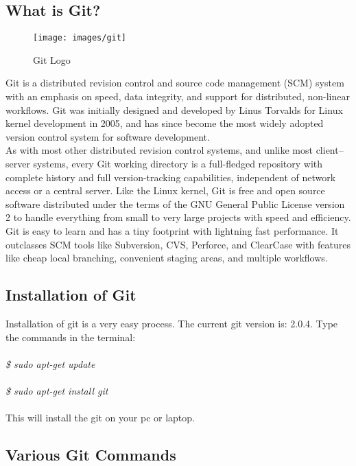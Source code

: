 \subsection{What is Git?}
\begin{figure}[!ht]
\centering
\texttt{[image: images/git]}                   
\caption{Git Logo}
\hspace{-1.5em}
\end{figure}
Git is a distributed revision control and source code management (SCM) system with an emphasis on speed, data integrity, and support for distributed, non-linear workflows. Git was initially designed and developed by Linus Torvalds for Linux kernel development in 2005, and has since become the most widely adopted version control system for software development.\\

As with most other distributed revision control systems, and unlike most client–server systems, every Git working directory is a full-fledged repository with complete history and full version-tracking capabilities, independent of network access or a central server. Like the Linux kernel, Git is free and open source software distributed under the terms of the GNU General Public License version 2 to handle everything from small to very large projects with speed and efficiency.\\

Git is easy to learn and has a tiny footprint with lightning fast performance. It outclasses SCM tools like Subversion, CVS, Perforce, and ClearCase with features like cheap local branching, convenient staging areas, and multiple workflows.\\

\subsection{Installation of Git}

Installation of git is a very easy process.
The current git version is: 2.0.4.
Type the commands in the terminal:\\\\
\emph{
\$ sudo apt-get update\\\\
\$ sudo apt-get install git\\\\}
This will install the git on your pc or laptop.

\subsection{Various Git Commands}

